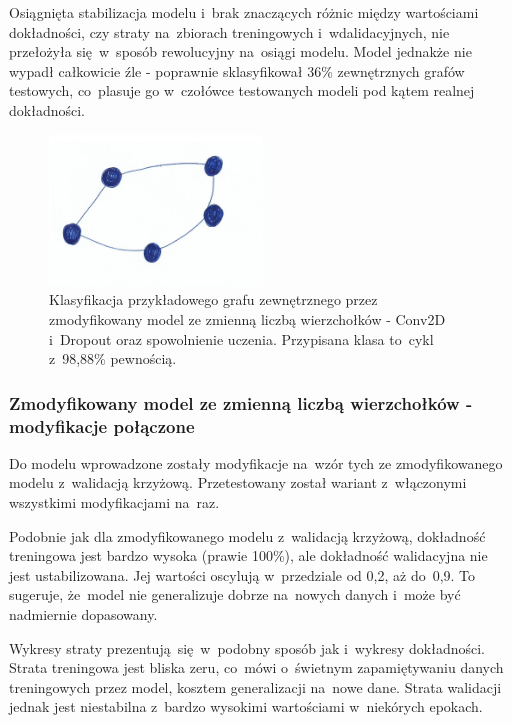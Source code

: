 Osiągnięta stabilizacja modelu i~brak znaczących różnic między wartościami dokładności,
czy straty na~zbiorach treningowych i~wdalidacyjnych, nie przełożyła się~w~sposób rewolucyjny na~osiągi modelu.
Model jednakże nie wypadł całkowicie źle - poprawnie sklasyfikował 36\% zewnętrznych grafów testowych,
co~plasuje go w~czołówce testowanych modeli pod kątem realnej dokładności.

\begin{figure}[ht]
	\centering
	\includegraphics[height=4cm]{../graph_classification/test_graphs/drawn/cycle-7.png}
	\caption{Klasyfikacja przykładowego grafu zewnętrznego przez zmodyfikowany model ze zmienną liczbą wierzchołków
		- Conv2D i~Dropout oraz spowolnienie uczenia.
		Przypisana klasa to~cykl z~98,88\% pewnością.}
	\label{Fig:tests-var-1d}
\end{figure}
\FloatBarrier

\subsubsection{Zmodyfikowany model ze zmienną liczbą wierzchołków - modyfikacje połączone}

Do modelu wprowadzone zostały modyfikacje na~wzór tych ze zmodyfikowanego modelu z~walidacją krzyżową.
Przetestowany został wariant z~włączonymi wszystkimi modyfikacjami na~raz.

Podobnie jak dla zmodyfikowanego modelu z~walidacją krzyżową, dokładność treningowa jest bardzo wysoka (prawie 100\%),
ale dokładność walidacyjna nie jest ustabilizowana. Jej wartości oscylują w~przedziale od 0,2, aż do~0,9.
To sugeruje, że~model nie generalizuje dobrze na~nowych danych i~może być nadmiernie dopasowany.

Wykresy straty prezentują~się~w~podobny sposób jak i~wykresy dokładności.
Strata treningowa jest bliska zeru, co~mówi o~świetnym zapamiętywaniu danych treningowych przez model, kosztem generalizacji na~nowe dane.
Strata walidacji jednak jest niestabilna z~bardzo wysokimi wartościami w~niekórych epokach.

